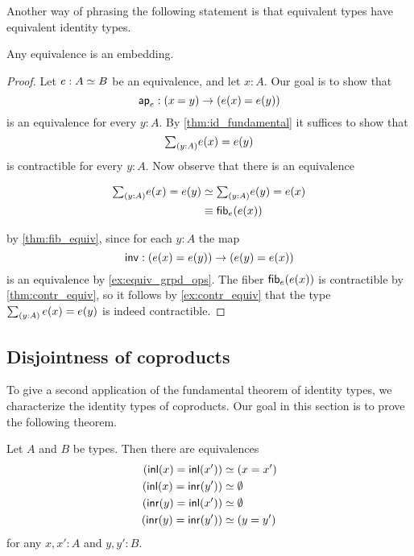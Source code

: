 Another way of phrasing the following statement is that equivalent types have equivalent identity types.

\begin{thm}
\label{cor:emb_equiv} 
Any equivalence is an embedding.
\end{thm}

\begin{proof}
Let $e:\eqv{A}{B}$ be an equivalence, and let $x:A$. Our goal is to show that
\begin{equation*}
\apfunc{e} : (\id{x}{y})\to (\id{e(x)}{e(y)})
\end{equation*}
is an equivalence for every $y:A$. By \cref{thm:id_fundamental} it suffices to show that 
\begin{equation*}
\sm{y:A}e(x)=e(y)
\end{equation*}
is contractible for every $y:A$. Now observe that there is an equivalence
\begin{samepage}
\begin{align*}
\sm{y:A}e(x)=e(y) & \eqvsym \sm{y:A}e(y)=e(x) \\
& \jdeq \fib{e}{e(x)}
\end{align*}
\end{samepage}
by \cref{thm:fib_equiv}, since for each $y:A$ the map
\begin{equation*}
\mathsf{inv} : (e(x)=e(y))\to (e(y)= e(x))
\end{equation*}
is an equivalence by \cref{ex:equiv_grpd_ops}.
The fiber $\mathsf{fib}_{e}(e(x))$ is contractible by \cref{thm:contr_equiv}, so it follows by \cref{ex:contr_equiv} that the type $\sm{y:A}e(x)=e(y)$ is indeed contractible.
\end{proof}

\subsection{Disjointness of coproducts}

To give a second application of the fundamental theorem of identity types, we characterize the identity types of coproducts. Our goal in this section is to prove the following theorem.

\begin{thm}\label{thm:id-coprod-compute}
Let $A$ and $B$ be types. Then there are equivalences
\begin{align*}
({\mathsf{inl}}(x)={\mathsf{inl}}(x')) & \simeq (x = x')\\
({\mathsf{inl}}(x)={\mathsf{inr}}(y')) & \simeq \emptyset \\
({\mathsf{inr}}(y)={\mathsf{inl}}(x')) & \simeq \emptyset \\
({\mathsf{inr}}(y)={\mathsf{inr}}(y')) & \simeq (y=y')
\end{align*}
for any $x,x':A$ and $y,y':B$.
\end{thm}

